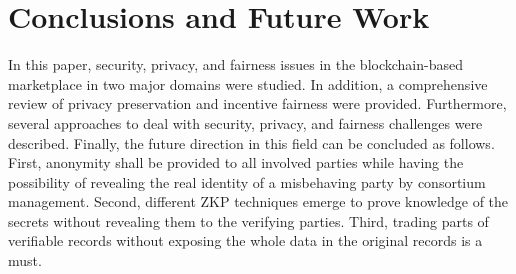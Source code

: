 \section{Conclusions and Future Work}
\label{sec:conclusions}
In this paper, security, privacy, and fairness issues in the blockchain-based marketplace in two major domains were studied.
In addition, a comprehensive review of privacy preservation and incentive fairness were provided.
Furthermore, several approaches to deal with security, privacy, and fairness challenges were described.
Finally, the future direction in this field can be concluded as follows.
First, anonymity shall be provided to all involved parties while having the possibility of revealing the real identity of a misbehaving party by consortium management.
Second, different ZKP techniques emerge to prove knowledge of the secrets without revealing them to the verifying parties.
Third, trading parts of verifiable records without exposing the whole data in the original records is a must.
